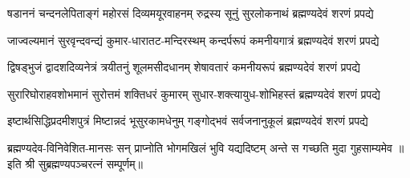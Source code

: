 
\fourlineindentedshloka
{षडाननं चन्दनलेपिताङ्गं}
{महोरसं दिव्यमयूरवाहनम्}
{रुद्रस्य सूनुं सुरलोकनाथं}
{ब्रह्मण्यदेवं शरणं प्रपद्ये}

\fourlineindentedshloka
{जाज्वल्यमानं सुरवृन्दवन्द्यं}
{कुमार-धारातट-मन्दिरस्थम्}
{कन्दर्परूपं कमनीयगात्रं}
{ब्रह्मण्यदेवं शरणं प्रपद्ये}

\fourlineindentedshloka
{द्विषड्भुजं द्वादशदिव्यनेत्रं}
{त्रयीतनुं शूलमसीदधानम्}
{शेषावतारं कमनीयरूपं}
{ब्रह्मण्यदेवं शरणं प्रपद्ये}

\fourlineindentedshloka
{सुरारिघोराहवशोभमानं}
{सुरोत्तमं शक्तिधरं कुमारम्}
{सुधार-शक्त्यायुध-शोभिहस्तं}
{ब्रह्मण्यदेवं शरणं प्रपद्ये}

\fourlineindentedshloka
{इष्टार्थसिद्धिप्रदमीशपुत्रं}
{मिष्टान्नदं भूसुरकामधेनुम्}
{गङ्गोद्भवं सर्वजनानुकूलं}
{ब्रह्मण्यदेवं शरणं प्रपद्ये}

{ब्रह्मण्यदेव-विनिवेशित-मानसः सन्}
{प्राप्नोति भोगमखिलं भुवि यद्यदिष्टम्}
{अन्ते स गच्छति मुदा गुहसाम्यमेव}
॥इति श्री सुब्रह्मण्यपञ्चरत्नं सम्पूर्णम्॥

